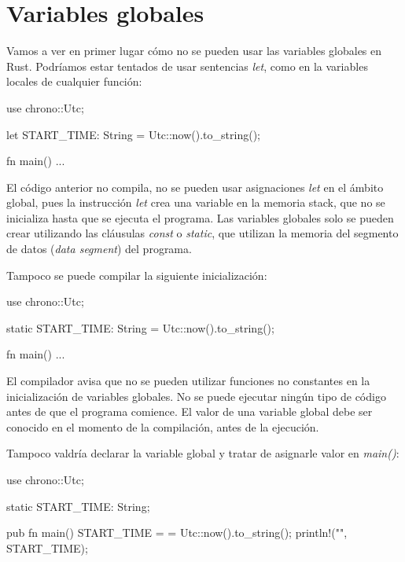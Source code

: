 \section{Variables globales}
Vamos a ver en primer lugar cómo no se pueden usar las variables globales en Rust. Podríamos estar tentados de usar sentencias \textit{let}, como en la variables locales de cualquier función:

\vspace{0.7em}
\begin{Codigo}
   use chrono::Utc;
   
   let START_TIME: String = Utc::now().to_string();
   
   fn main() {
      ...
   }
\end{Codigo}

El código anterior no compila, no se pueden usar asignaciones \textit{let} en el ámbito global, pues la instrucción \textit{let} crea una variable en la memoria stack, que no se inicializa hasta que se ejecuta el programa. Las variables globales solo se pueden crear utilizando las cláusulas \textit{const} o \textit{static}, que utilizan la memoria del segmento de datos (\textit{data segment}) del programa. 

Tampoco se puede compilar la siguiente inicialización:

\vspace{0.7em}
\begin{Codigo}
   use chrono::Utc;
   
   static START_TIME: String = Utc::now().to_string();
   
   fn main() {
      ...
   }
\end{Codigo}

El compilador avisa que no se pueden utilizar funciones no constantes en la inicialización de variables globales. No se puede ejecutar ningún tipo de código antes de que el programa comience. El valor de una variable global debe ser conocido en el momento de la compilación, antes de la ejecución. 

Tampoco valdría declarar la variable global y tratar de asignarle valor en \textit{main()}:

\vspace{0.7em}
\begin{Codigo}
   use chrono::Utc;
   
   static START_TIME: String;
   
   pub fn main() {
      START_TIME =  = Utc::now().to_string();
      println!("{}", START_TIME);
   }
\end{Codigo}

